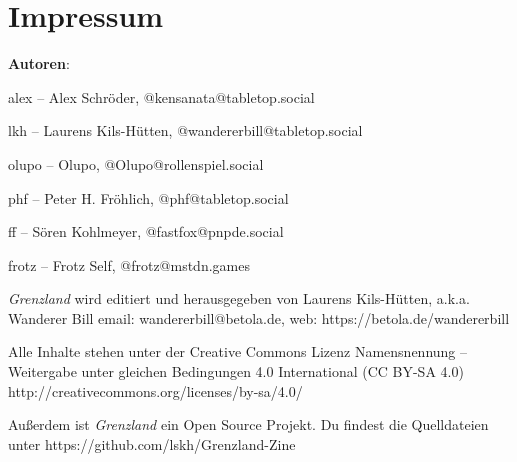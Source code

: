 \documentclass[11pt]{wbzine}
\begin{document}
\section{Impressum}

\textbf{Autoren}:

alex -- Alex Schröder, @kensanata@tabletop.social

lkh -- Laurens Kils-Hütten, @wandererbill@tabletop.social

olupo -- Olupo, @Olupo@rollenspiel.social

phf -- Peter H. Fröhlich, @phf@tabletop.social

ff -- Sören Kohlmeyer, @fastfox@pnpde.social

frotz -- Frotz Self, @frotz@mstdn.games

\textit{Grenzland} wird editiert und
herausgegeben von Laurens Kils-Hütten,
a.k.a. Wanderer Bill
email: wandererbill@betola.de, web: https://betola.de/wandererbill

Alle Inhalte stehen unter der Creative Commons Lizenz
Namensnennung -- Weitergabe unter gleichen Bedingungen 4.0 International (CC BY-SA 4.0)\\
http://creativecommons.org/licenses/by-sa/4.0/

Außerdem ist \textit{Grenzland} ein Open Source Projekt. Du
findest die Quelldateien unter
https://github.com/lskh/Grenzland-Zine

\newpage\thispagestyle{empty}\null

\end{document}

